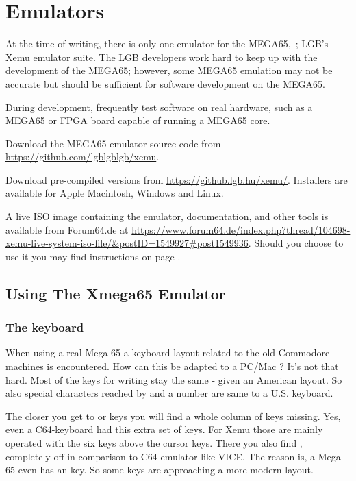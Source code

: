 \chapter{Emulators}

At the time of writing, there is only one emulator for the MEGA65,\ ; LGB's Xemu emulator suite. The LGB developers work hard to keep up with the development of the MEGA65; however, some MEGA65 emulation may not be accurate but should be sufficient for software development on the MEGA65.


During development, frequently test software on real hardware, such as a MEGA65 or FPGA board capable of running a MEGA65 core.

Download the MEGA65 emulator source code from \url{https://github.com/lgblgblgb/xemu}.

Download pre-compiled versions from \url{https://github.lgb.hu/xemu/}. Installers are
available for Apple Macintosh, Windows and Linux.

A live ISO image containing the emulator, documentation, and other tools is available from
Forum64.de
at \url{https://www.forum64.de/index.php?thread/104698-xemu-live-system-iso-file/\&postID=1549927\#post1549936}.
Should you choose to use it you may find instructions on page \pageref{sec:live-iso-image}.

\section{Using The Xmega65 Emulator}

\subsection{The keyboard}

When using a real Mega 65 a keyboard layout related to the old Commodore machines is
encountered. How can this be adapted to a PC/Mac ? It's not that hard. Most of the keys
for writing stay the same - given an American layout. So also special characters reached
by  and a number are same to a U.S. keyboard.

The closer you get to  or  keys you will find
a whole column of keys missing. Yes, even a C64-keyboard had this extra set of keys. For
Xemu those are mainly operated with the six keys above the cursor keys. There you also
find , completely off in comparison to C64 emulator like VICE. The reason is, a Mega 65 even has an  key. So some keys are approaching a
more modern layout.

